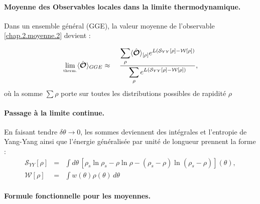

\paragraph{Moyenne des Observables locales dans la limite thermodynamique.}

Dans un ensemble général (GGE), la valeur moyenne de l’observable \eqref{chap.2.moyenne.2} devient :	
	
\begin{eqnarray}\label{chap.2.moyenne.3}
	\underset{\mbox{\tiny therm.}}{\lim} \langle \hat{\bm{\mathcal{O}}} \rangle_{GGE} &  \approx &  ~ \frac{  \displaystyle \sum_{\rho }  \langle \hat{\bm{\mathcal{O}}}\rangle_{[\rho]}  e^{L(\mathcal{S}_{YY}[\rho] -  \mathcal{W}[\rho]) }}{ \displaystyle \sum_{\rho } e^{L(\mathcal{S}_{YY}[\rho] -  \mathcal{W}[\rho]) } },
\end{eqnarray}
où la somme $\sum\rho$ porte sur toutes les distributions possibles de rapidité $\rho$

\paragraph{Passage à la limite continue.}
En faisant tendre $\delta\theta \to 0$, les sommes deviennent des intégrales 
et l'entropie de Yang-Yang ainsi que l’énergie généralisée par unité de longueur prennent la forme :
\begin{eqnarray}
	\mathcal{S}_{YY}[\rho] & = & \int d \theta  \, [ \rho_s\ln \rho_s - \rho \ln \rho - ( \rho_s - \rho ) \ln ( \rho_s - \rho ) ] (\theta) , \label{chap.2.entropi.int}\\
	\mathcal{W}[\rho] & = & \int   w(\theta) \rho(\theta) \, d \theta \label{chap.2.W.int}		
\end{eqnarray}

\paragraph{Formule fonctionnelle pour les moyennes.}

